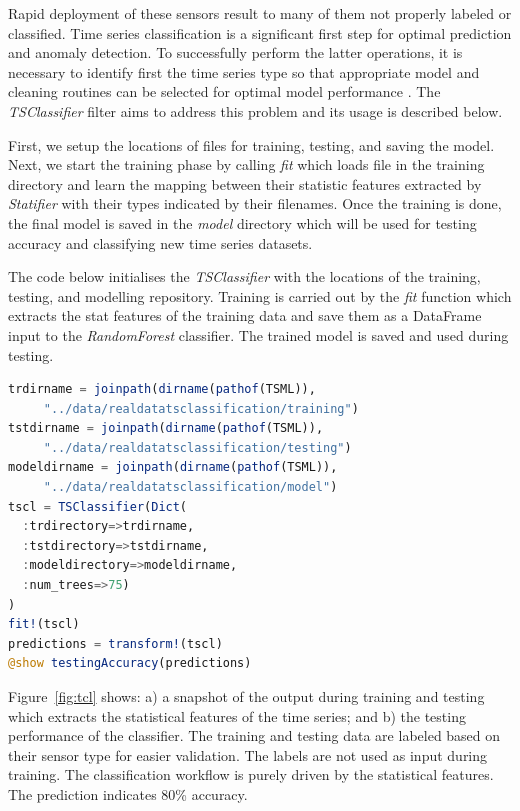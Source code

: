 \documentclass{juliacon}
\begin{document}
Rapid deployment of these sensors result to many of them not properly labeled or classified.
Time series classification is a significant first step for optimal prediction and anomaly detection.
To successfully perform the latter operations, it is necessary to identify first the time series
type so that appropriate model and cleaning routines can be selected for optimal model performance . 
The  \emph{TSClassifier} filter aims to address this problem and its usage is described below.

\vskip 6pt
First, we setup the locations of files for training, testing, and saving the model.
Next, we start the training phase by calling \emph{fit} which loads
file in the training directory and learn the mapping between their
statistic features extracted by \emph{Statifier} with their types indicated
by their filenames. Once the training is done, the final model
is saved in the \emph{model} directory which will be used for 
testing accuracy and classifying new time series datasets. 

The code below initialises the \emph{TSClassifier} with the locations of the training, testing, and modelling repository. Training is carried out by the \emph{fit} function which extracts the stat features of the training data and save them as a DataFrame input to the \emph{RandomForest} classifier. The trained model is saved and used during testing.

\begin{lstlisting}[language = Julia]
trdirname = joinpath(dirname(pathof(TSML)),
     "../data/realdatatsclassification/training")
tstdirname = joinpath(dirname(pathof(TSML)),
     "../data/realdatatsclassification/testing")
modeldirname = joinpath(dirname(pathof(TSML)),
     "../data/realdatatsclassification/model")
tscl = TSClassifier(Dict(
  :trdirectory=>trdirname,
  :tstdirectory=>tstdirname,
  :modeldirectory=>modeldirname,
  :num_trees=>75)
)
fit!(tscl)
predictions = transform!(tscl)
@show testingAccuracy(predictions)
\end{lstlisting}

Figure~\ref{fig:tcl} shows: a) a snapshot of the output during training and testing which extracts the statistical features of the time series; and b) the testing performance of the classifier. The training and testing data are labeled based on their sensor type for easier validation. The labels are not used as input during training. The classification workflow is purely driven by the statistical features. The prediction indicates 80\% accuracy.
\end{document}
